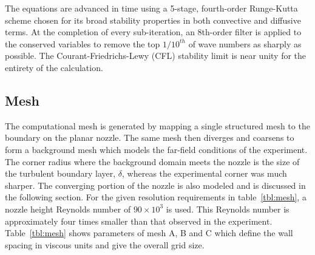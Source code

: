 \documentclass[]{aiaa-tc}%
\begin{document}
The equations are advanced in time using a 5-stage, fourth-order Runge-Kutta scheme\cite{Kennedy:00} chosen for its broad stability properties in both convective and diffusive terms.  At the completion of every sub-iteration, an 8th-order filter is applied to the conserved variables to remove the top $1/10^{th}$ of wave numbers as sharply as possible.  The Courant-Friedrichs-Lewy (CFL) stability limit is near unity for the entirety of the calculation.

\subsection{Mesh}

The computational mesh is generated by mapping a single structured mesh to the boundary on the planar nozzle.  The same mesh then diverges and coarsens to form a background mesh which models the far-field conditions of the experiment.  The corner radius where the background domain meets the nozzle is the size of the turbulent boundary layer, $\delta$, whereas the experimental corner was much sharper.  The converging portion of the nozzle is also modeled and is discussed in the following section.   
For the given resolution requirements in table~\ref{tbl:mesh}, a nozzle height Reynolds number of $90\times 10^3$ is used.  This Reynolds number is approximately four times smaller than that observed in the experiment.  Table~\ref{tbl:mesh} shows parameters of mesh A, B and C which define the wall spacing in viscous units and give the overall grid size.  
\end{document}
